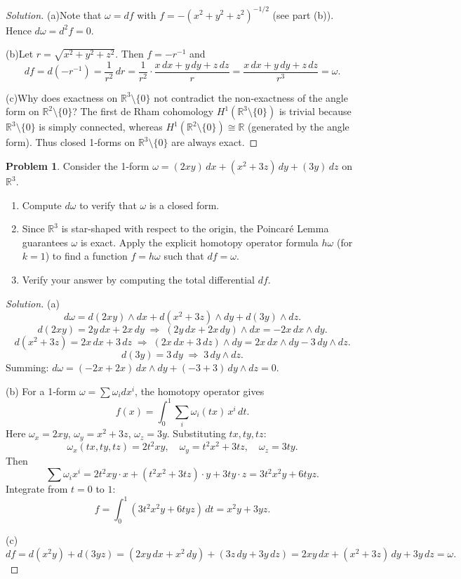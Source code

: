 \documentclass[12pt, a4paper]{article}
\theoremstyle{definition}
\newtheorem{problem}{Problem}
\newenvironment{solution}
  {\renewcommand\qedsymbol{$\blacksquare$}\begin{proof}[Solution]}
  {\end{proof}}
\begin{document}
\begin{solution}

(a)Note that \(\omega = df\) with \(f=-(x^{2}+y^{2}+z^{2})^{-1/2}\) (see part (b)). Hence \(d\omega = d^{2}f = 0\).

(b)Let \(r = \sqrt{x^{2}+y^{2}+z^{2}}\). Then \(f = -r^{-1}\) and
\[
df = d(-r^{-1}) = \frac{1}{r^{2}}\,dr = \frac{1}{r^{2}}\cdot\frac{x\,dx+y\,dy+z\,dz}{r} = \frac{x\,dx+y\,dy+z\,dz}{r^{3}} = \omega.
\]

(c)Why does exactness on \(\mathbb{R}^{3}\setminus\{0\}\) not contradict the non‑exactness of the angle form on \(\mathbb{R}^{2}\setminus\{0\}\)?
The first de Rham cohomology \(H^{1}(\mathbb{R}^{3}\setminus\{0\})\) is trivial because \(\mathbb{R}^{3}\setminus\{0\}\) is simply connected, whereas \(H^{1}(\mathbb{R}^{2}\setminus\{0\})\cong\mathbb{R}\) (generated by the angle form). Thus closed 1‑forms on \(\mathbb{R}^{3}\setminus\{0\}\) are always exact.
\end{solution}

\vfill\newpage

\begin{problem}
Consider the 1-form $\omega = (2xy) \, dx + (x^2 + 3z) \, dy + (3y) \, dz$ on $\mathbb{R}^3$.
\begin{enumerate}
    \item[(a)] Compute $d\omega$ to verify that $\omega$ is a closed form.
    \item[(b)] Since $\mathbb{R}^3$ is star-shaped with respect to the origin, the Poincar\'e Lemma guarantees $\omega$ is exact. Apply the explicit homotopy operator formula $h\omega$ (for $k=1$) to find a function $f = h\omega$ such that $df = \omega$.
    \item[(c)] Verify your answer by computing the total differential $df$.
\end{enumerate}
\end{problem}

\begin{solution}

(a)
\[
d\omega = d(2xy)\wedge dx + d(x^{2}+3z)\wedge dy + d(3y)\wedge dz.
\]
\[
d(2xy)=2y\,dx+2x\,dy \;\Rightarrow\; (2y\,dx+2x\,dy)\wedge dx = -2x\,dx\wedge dy.
\]
\[
d(x^{2}+3z)=2x\,dx+3\,dz \;\Rightarrow\; (2x\,dx+3\,dz)\wedge dy = 2x\,dx\wedge dy -3\,dy\wedge dz.
\]
\[
d(3y)=3\,dy \;\Rightarrow\; 3\,dy\wedge dz.
\]
Summing: \(d\omega = (-2x+2x)\,dx\wedge dy + (-3+3)\,dy\wedge dz = 0\).

(b)
For a 1‑form \(\omega = \sum \omega_i dx^i\), the homotopy operator gives
\[
f(x) = \int_{0}^{1} \sum_i \omega_i(tx)\, x^i \, dt.
\]
Here \(\omega_x = 2xy\), \(\omega_y = x^{2}+3z\), \(\omega_z = 3y\). Substituting \(tx,ty,tz\):
\[
\omega_x(tx,ty,tz)=2t^{2}xy,\quad \omega_y = t^{2}x^{2}+3tz,\quad \omega_z = 3ty.
\]
Then
\[
\sum \omega_i x^i = 2t^{2}xy\cdot x + (t^{2}x^{2}+3tz)\cdot y + 3ty\cdot z = 3t^{2}x^{2}y + 6t y z.
\]
Integrate from \(t=0\) to \(1\):
\[
f = \int_{0}^{1} (3t^{2}x^{2}y + 6t y z)\,dt = x^{2}y + 3yz.
\]

(c)
\[
df = d(x^{2}y) + d(3yz) = (2xy\,dx + x^{2}\,dy) + (3z\,dy + 3y\,dz) = 2xy\,dx + (x^{2}+3z)\,dy + 3y\,dz = \omega.
\]
\end{solution}
\end{document}
